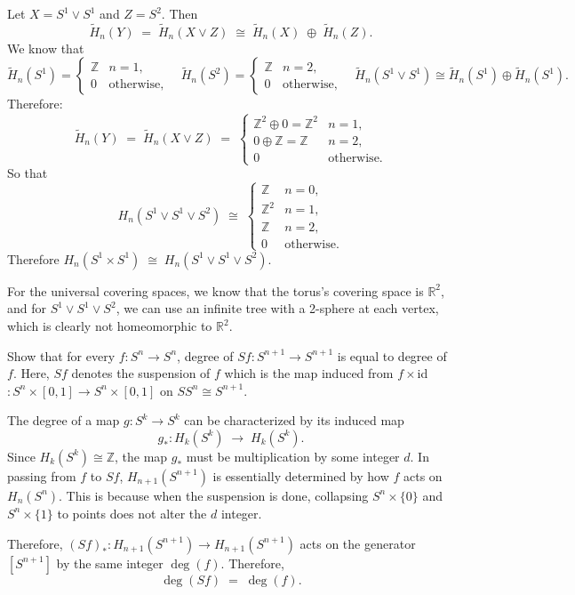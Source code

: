\documentclass[12pt]{article}
\newcommand{\R}{\mathbb{R}}
\begin{document}
\begin{newproof}
  Let $X = S^1 \vee S^1$ and $Z = S^2$. Then
  $$ \widetilde{H}_n(Y) \;=\; \widetilde{H}_n(X \vee Z) 
    \;\cong\; 
    \widetilde{H}_n(X) \;\oplus\; \widetilde{H}_n(Z). $$
  We know that 
  $$ \widetilde{H}_n(S^1) = 
    \begin{cases}
      \mathbb{Z} & n=1,\\
      0 & \text{otherwise},
    \end{cases}
    \quad
    \widetilde{H}_n(S^2) =
      \begin{cases}
        \mathbb{Z} & n=2,\\
        0 & \text{otherwise},
      \end{cases}
      \quad
      \widetilde{H}_n(S^1 \vee S^1) \cong \widetilde{H}_n(S^1) \oplus \widetilde{H}_n(S^1). $$
  Therefore:
  $$ \widetilde{H}_n(Y) 
      \;=\;
    \widetilde{H}_n(X \vee Z)
    \;=\;
    \begin{cases}
      \mathbb{Z}^2 \oplus 0 = \mathbb{Z}^2 & n=1,\\
      0 \oplus \mathbb{Z} = \mathbb{Z} & n=2,\\
      0 & \text{otherwise}.
    \end{cases} $$
  So that
  $$ H_n(S^1 \vee S^1 \vee S^2) 
    \;\cong\;
    \begin{cases}
      \mathbb{Z} & n=0,\\
      \mathbb{Z}^2 & n=1,\\
      \mathbb{Z} & n=2,\\
      0 & \text{otherwise}.
    \end{cases} $$
  Therefore $H_n(S^1 \times S^1) \;\cong\; H_n(S^1 \vee S^1 \vee S^2).$

  For the universal covering spaces, we know that the torus's covering space is $\R^2$, and for $S^1 \vee S^1 \vee S^2$, we can use an infinite tree with a 2-sphere at each vertex, which is clearly not homeomorphic to $\mathbb{R}^2$.
\end{newproof}

\begin{statement}[2]
  Show that for every $f:S^n \to S^n$, degree of $Sf:S^{n+1} \to S^{n+1}$ is equal to degree of $f$. Here, $Sf$ denotes the suspension of $f$ 
  which is the map induced from $f \times$id$:S^n \times [0,1] \to S^n \times [0,1]$ on $SS^n \cong S^{n+1}$. 
\end{statement}
\begin{newproof}
  The degree of a map $g: S^k \to S^k$ can be characterized by its induced map 
      $$
        g_*: H_k(S^k) \;\longrightarrow\; H_k(S^k).
      $$
      Since $H_k(S^k) \cong \mathbb{Z}$, the map $g_*$ must be multiplication by some integer $d$. In passing from $f$ to $Sf$, $H_{n+1}(S^{n+1})$ is essentially determined by how $f$ acts on $H_n(S^n)$. This is because when the suspension is done, collapsing $S^n \times \{0\}$ and $S^n \times \{1\}$ to points does not alter the $d$ integer.
    
    Therefore, $(Sf)_* : H_{n+1}(S^{n+1}) \to H_{n+1}(S^{n+1})$ acts on the generator $[S^{n+1}]$ by the same integer $\deg(f)$. Therefore,
      $$
        \deg(Sf) \;=\; \deg(f).
      $$
\end{newproof}
\end{document}
